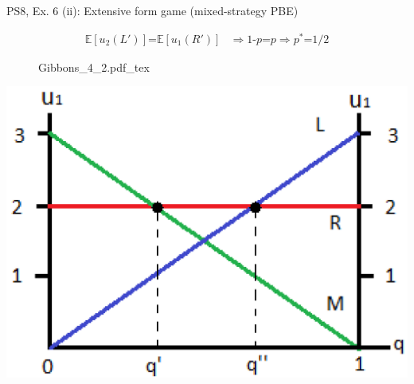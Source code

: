 \begin{frame}{PS8, Ex. 6 (ii): Extensive form game (mixed-strategy PBE)}
\begin{multicols}{2}
      \begin{align*}
        \mathbb{E}[u_2(L')]\text{=}\mathbb{E}[u_1(R')]&\Rightarrow \text{1-}p\text{=}p\Rightarrow p^*\text{=}1/2
      \end{align*}
      \vfill\null\columnbreak
      \begin{figure}[!h]
        \center {}
        {Gibbons_4_2.pdf_tex}
      \end{figure}
      \includegraphics[width=1.1\columnwidth]{figures/Gibbons_4_2_E[u]}
      \vfill\null
    \end{multicols}
\end{frame}
